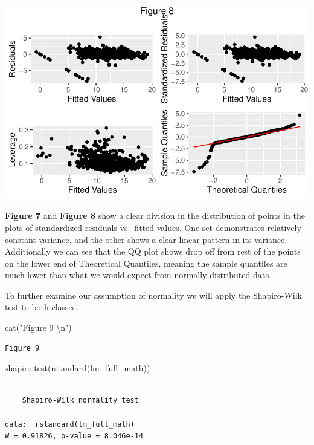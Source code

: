 \documentclass[
  letterpaper,
  DIV=11,
  numbers=noendperiod]{scrartcl}
\newenvironment{Shaded}{\begin{snugshade}}{\end{snugshade}}
\newcommand{\FunctionTok}[1]{\textcolor[rgb]{0.28,0.35,0.67}{#1}}
\newcommand{\NormalTok}[1]{\textcolor[rgb]{0.00,0.23,0.31}{#1}}
\newcommand{\SpecialCharTok}[1]{\textcolor[rgb]{0.37,0.37,0.37}{#1}}
\newcommand{\StringTok}[1]{\textcolor[rgb]{0.13,0.47,0.30}{#1}}
\begin{document}
\includegraphics{Final_Paper_edit_files/figure-pdf/unnamed-chunk-7-2.pdf}

\textbf{Figure 7} and \textbf{Figure 8} show a clear division in the
distribution of points in the plots of standardized residuals vs.~fitted
values. One set demonstrates relatively constant variance, and the other
shows a clear linear pattern in its variance. Additionally we can see
that the QQ plot shows drop off from rest of the points on the lower end
of Theoretical Quantiles, meaning the sample quantiles are much lower
than what we would expect from normally distributed data.

To further examine our assumption of normality we will apply the
Shapiro-Wilk test to both classes.

\begin{Shaded}
\begin{Highlighting}[]
\FunctionTok{cat}\NormalTok{(}\StringTok{"Figure 9 }\SpecialCharTok{\textbackslash{}n}\StringTok{"}\NormalTok{)}
\end{Highlighting}
\end{Shaded}

\begin{verbatim}
Figure 9 
\end{verbatim}

\begin{Shaded}
\begin{Highlighting}[]
\FunctionTok{shapiro.test}\NormalTok{(}\FunctionTok{rstandard}\NormalTok{(lm\_full\_math))}
\end{Highlighting}
\end{Shaded}

\begin{verbatim}

    Shapiro-Wilk normality test

data:  rstandard(lm_full_math)
W = 0.91826, p-value = 8.046e-14
\end{verbatim}
\end{document}

